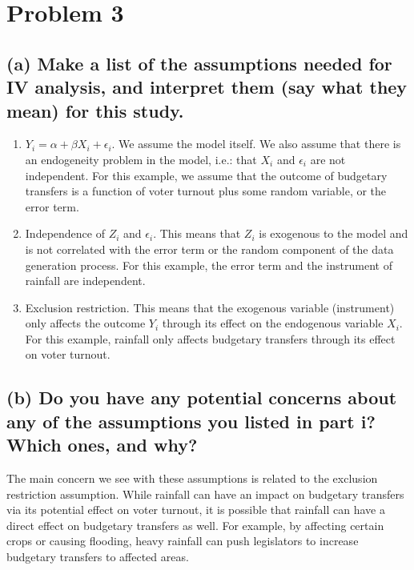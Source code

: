 \documentclass[
]{article}
\begin{document}
\hypertarget{problem-3}{%
\section{Problem 3}\label{problem-3}}

\hypertarget{a-make-a-list-of-the-assumptions-needed-for-iv-analysis-and-interpret-them-say-what-they-mean-for-this-study.}{%
\subsection{(a) Make a list of the assumptions needed for IV analysis,
and interpret them (say what they mean) for this
study.}\label{a-make-a-list-of-the-assumptions-needed-for-iv-analysis-and-interpret-them-say-what-they-mean-for-this-study.}}

\begin{enumerate}
  \item $Y_{i}=\alpha+\beta X_{i}+\epsilon_{i}$. We assume the model itself. We also assume that there is an endogeneity problem in the model, i.e.: that $X_{i}$ and $\epsilon_{i}$ are not independent. For this example, we assume that the outcome of budgetary transfers is a function of voter turnout plus some random variable, or the error term. 
  \item Independence of $Z_{i}$ and $\epsilon_{i}$. This means that $Z_{i}$ is exogenous to the model and is not correlated with the error term or the random component of the data generation process. For this example, the error term and the instrument of rainfall are independent. 
  \item Exclusion restriction. This means that the exogenous variable (instrument) only affects the outcome $Y_{i}$ through its effect on the endogenous variable $X_{i}$. For this example, rainfall only affects budgetary transfers through its effect on voter turnout. 
\end{enumerate}

\hypertarget{b-do-you-have-any-potential-concerns-about-any-of-the-assumptions-you-listed-in-part-i-which-ones-and-why}{%
\subsection{(b) Do you have any potential concerns about any of the
assumptions you listed in part i? Which ones, and
why?}\label{b-do-you-have-any-potential-concerns-about-any-of-the-assumptions-you-listed-in-part-i-which-ones-and-why}}

The main concern we see with these assumptions is related to the
exclusion restriction assumption. While rainfall can have an impact on
budgetary transfers via its potential effect on voter turnout, it is
possible that rainfall can have a direct effect on budgetary transfers
as well. For example, by affecting certain crops or causing flooding,
heavy rainfall can push legislators to increase budgetary transfers to
affected areas.
\end{document}
